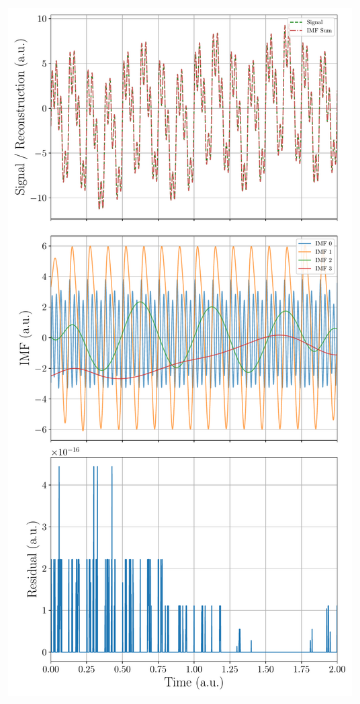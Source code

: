 \documentclass[a4paper,DIV=12,english]{scrartcl}
\begin{document}
\begin{figure}
    \centering
    \begin{subfigure}{0.49\textwidth}
        \centering
        \includegraphics[width=\textwidth]{../imf.pdf}
        \caption{}
        \label{subfig:imf}

\end{subfigure}
\end{figure}
\end{document}
